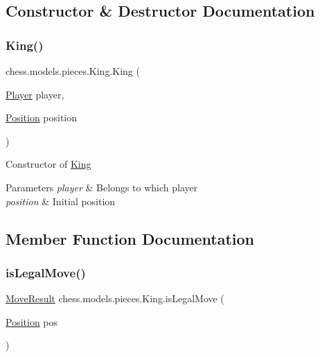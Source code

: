 \subsection{Constructor \& Destructor Documentation}
\mbox{\label{classchess_1_1models_1_1pieces_1_1_king_abc06c6362a34a9f7289c374c50d3b728}} 
\subsubsection{\texorpdfstring{King()}{King()}}
{\footnotesize\ttfamily chess.\+models.\+pieces.\+King.\+King (\begin{DoxyParamCaption}\item[{\mbox{\hyperlink{enumchess_1_1models_1_1enums_1_1_player}{Player}}}]{player,  }\item[{\mbox{\hyperlink{classchess_1_1models_1_1_position}{Position}}}]{position }\end{DoxyParamCaption})}

Constructor of \mbox{\hyperlink{classchess_1_1models_1_1pieces_1_1_king}{King}}


\begin{DoxyParams}{Parameters}
{\em player} & Belongs to which player \\
\hline
{\em position} & Initial position \\
\hline
\end{DoxyParams}


\subsection{Member Function Documentation}
\mbox{\label{classchess_1_1models_1_1pieces_1_1_king_ad72471e97d1e053467189babdc18c231}} 
\subsubsection{\texorpdfstring{is\+Legal\+Move()}{isLegalMove()}}
{\footnotesize\ttfamily \mbox{\hyperlink{enumchess_1_1models_1_1enums_1_1_move_result}{Move\+Result}} chess.\+models.\+pieces.\+King.\+is\+Legal\+Move (\begin{DoxyParamCaption}\item[{\mbox{\hyperlink{classchess_1_1models_1_1_position}{Position}}}]{pos }\end{DoxyParamCaption})}

